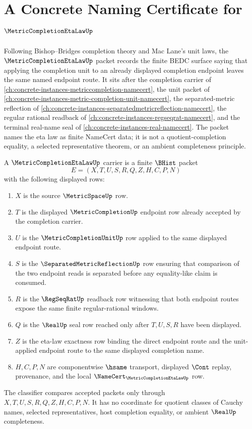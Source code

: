 \chapter{A Concrete Naming Certificate for $\MetricCompletionEtaLawUp$}
\label{ch:concrete-instances-metric-completion-eta-law-namecert}

Following Bishop--Bridges completion theory and Mac Lane's unit laws, the $\MetricCompletionEtaLawUp$ packet records the finite BEDC surface saying that applying the completion unit to an already displayed completion endpoint leaves the same named endpoint route. It sits after the completion carrier of \autoref{ch:concrete-instances-metriccompletion-namecert}, the unit packet of \autoref{ch:concrete-instances-metric-completion-unit-namecert}, the separated-metric reflection of \autoref{ch:concrete-instances-separatedmetricreflection-namecert}, the regular rational readback of \autoref{ch:concrete-instances-regseqrat-namecert}, and the terminal real-name seal of \autoref{ch:concrete-instances-real-namecert}. The packet names the eta law as finite NameCert data; it is not a quotient-completion equality, a selected representative theorem, or an ambient completeness principle.

\begin{definition}
\label{def:metric-completion-eta-law-carrier}
A $\MetricCompletionEtaLawUp$ carrier is a finite $\BHist$ packet
$$
E=(X,T,U,S,R,Q,Z,H,C,P,N)
$$
with the following displayed rows:
\begin{enumerate}
\item $X$ is the source $\MetricSpaceUp$ row.
\item $T$ is the displayed $\MetricCompletionUp$ endpoint row already accepted by the completion carrier.
\item $U$ is the $\MetricCompletionUnitUp$ row applied to the same displayed endpoint route.
\item $S$ is the $\SeparatedMetricReflectionUp$ row ensuring that comparison of the two endpoint reads is separated before any equality-like claim is consumed.
\item $R$ is the $\RegSeqRatUp$ readback row witnessing that both endpoint routes expose the same finite regular-rational windows.
\item $Q$ is the $\RealUp$ seal row reached only after $T,U,S,R$ have been displayed.
\item $Z$ is the eta-law exactness row binding the direct endpoint route and the unit-applied endpoint route to the same displayed completion name.
\item $H,C,P,N$ are componentwise $\hsame$ transport, displayed $\Cont$ replay, provenance, and the local $\NameCert_{\MetricCompletionEtaLawUp}$ row.
\end{enumerate}
The classifier compares accepted packets only through $X,T,U,S,R,Q,Z,H,C,P,N$. It has no coordinate for quotient classes of Cauchy names, selected representatives, host completion equality, or ambient $\RealUp$ completeness.
\end{definition}

